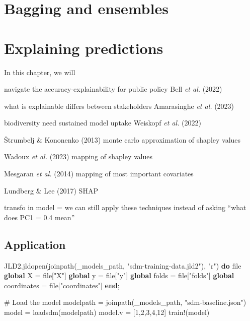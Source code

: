 \documentclass[
  letterpaper,
]{scrbook}
\newenvironment{Shaded}{\begin{snugshade}}{\end{snugshade}}
\newcommand{\CommentTok}[1]{\textcolor[rgb]{0.37,0.37,0.37}{#1}}
\newcommand{\ControlFlowTok}[1]{\textcolor[rgb]{0.00,0.23,0.31}{\textbf{#1}}}
\newcommand{\FloatTok}[1]{\textcolor[rgb]{0.68,0.00,0.00}{#1}}
\newcommand{\FunctionTok}[1]{\textcolor[rgb]{0.28,0.35,0.67}{#1}}
\newcommand{\KeywordTok}[1]{\textcolor[rgb]{0.00,0.23,0.31}{\textbf{#1}}}
\newcommand{\NormalTok}[1]{\textcolor[rgb]{0.00,0.23,0.31}{#1}}
\newcommand{\OperatorTok}[1]{\textcolor[rgb]{0.37,0.37,0.37}{#1}}
\newcommand{\StringTok}[1]{\textcolor[rgb]{0.13,0.47,0.30}{#1}}
\begin{document}
\chapter{Bagging and ensembles}\label{sec-bagging}


\chapter{Explaining predictions}\label{sec-explanations}

In this chapter, we will

navigate the accuracy-explainability for public policy Bell \emph{et
al.} (2022)

what is explainable differs between stakeholders Amarasinghe \emph{et
al.} (2023)

biodiversity need sustained model uptake Weiskopf \emph{et al.} (2022)

Štrumbelj \& Kononenko (2013) monte carlo approximation of shapley
values

Wadoux \emph{et al.} (2023) mapping of shapley values

Mesgaran \emph{et al.} (2014) mapping of most important covariates

Lundberg \& Lee (2017) SHAP

transfo in model = we can still apply these techniques instead of asking
``what does PC1 = 0.4 mean''

\section{Application}\label{application}

\begin{Shaded}
\begin{Highlighting}[]
\NormalTok{JLD2.}\FunctionTok{jldopen}\NormalTok{(}\FunctionTok{joinpath}\NormalTok{(\_models\_path, }\StringTok{"sdm{-}training{-}data.jld2"}\NormalTok{), }\StringTok{"r"}\NormalTok{) }\ControlFlowTok{do}\NormalTok{ file}
    \KeywordTok{global}\NormalTok{ X }\OperatorTok{=}\NormalTok{ file[}\StringTok{"X"}\NormalTok{]}
    \KeywordTok{global}\NormalTok{ y }\OperatorTok{=}\NormalTok{ file[}\StringTok{"y"}\NormalTok{]}
    \KeywordTok{global}\NormalTok{ folds }\OperatorTok{=}\NormalTok{ file[}\StringTok{"folds"}\NormalTok{]}
    \KeywordTok{global}\NormalTok{ coordinates }\OperatorTok{=}\NormalTok{ file[}\StringTok{"coordinates"}\NormalTok{]}
\ControlFlowTok{end}\NormalTok{;}

\CommentTok{\# Load the model}
\NormalTok{modelpath }\OperatorTok{=} \FunctionTok{joinpath}\NormalTok{(\_models\_path, }\StringTok{"sdm{-}baseline.json"}\NormalTok{)}
\NormalTok{model }\OperatorTok{=} \FunctionTok{loadsdm}\NormalTok{(modelpath)}
\NormalTok{model.v }\OperatorTok{=}\NormalTok{ [}\FloatTok{1}\NormalTok{,}\FloatTok{2}\NormalTok{,}\FloatTok{3}\NormalTok{,}\FloatTok{4}\NormalTok{,}\FloatTok{12}\NormalTok{]}
\FunctionTok{train!}\NormalTok{(model)}
\end{Highlighting}
\end{Shaded}
\end{document}
